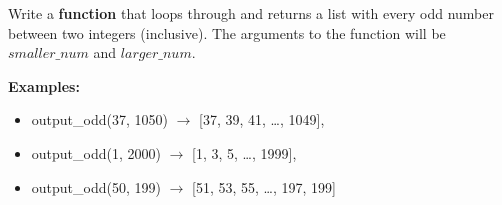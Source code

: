 	\item 
		Write a \textbf{function} that loops through and returns a list with every odd number between two
		integers (inclusive). The arguments to the function will be $smaller\_num$ and 
		$larger\_num$.

		\textbf{Examples:}		
		\begin{itemize}
			\item  output\_odd(37, 1050) $\rightarrow$ [37, 39, 41, \dots, 1049], 
			\item  output\_odd(1, 2000) $\rightarrow$ [1, 3, 5, \dots, 1999], 
			\item  output\_odd(50, 199) $\rightarrow$ [51, 53, 55, \dots, 197, 199]
		\end{itemize}


